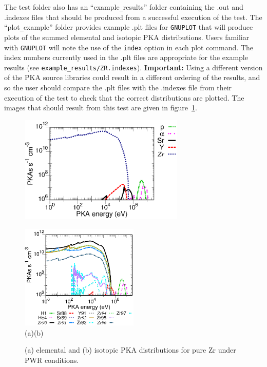\documentclass[a4paper]{article}
\begin{document}
The test folder also has an ``example\verb|_|results'' folder containing the .out and .indexes files that should be produced from a successful execution of the test. The ``plot\verb|_|example'' folder provides example .plt files for \texttt{GNUPLOT} that will produce plots of the summed elemental and isotopic PKA distributions. Users familiar with \texttt{GNUPLOT} will note the use of the \texttt{index} option in each plot command. The index numbers currently used in the .plt files are appropriate for the example results (see \texttt{example\_results/ZR.indexes}). \textbf{Important:} Using a different version of the PKA source libraries could result in a different ordering of the results, and so the user should compare the .plt files with the .indexes file from their execution of the test to check that the correct distributions are plotted. The images that should result from this test are given in figure~\ref{pka_graphs}.




\begin{figure}[t]
\hskip-1.5cm
\parbox[b][7cm][t]{0.7\textwidth}{\includegraphics[width=0.7\textwidth]
{ZR_elemental}}%
\includegraphics[width=0.5\textwidth]
{ZR_isotope}\\
\vskip-1.0cm
\hskip-0.5cm(a)\hskip7.2cm(b)
\caption{\label{pka_graphs}(a) elemental and (b) isotopic PKA distributions for pure Zr under PWR conditions.}
\end{figure}
\end{document}

